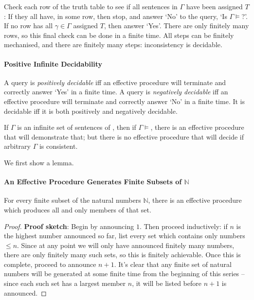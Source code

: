 Check each row of the truth table to see if all sentences in $\Gamma$ have been assigned $T$: If they all have, in some row, then stop, and answer `No' to the query, `Is $\Gamma\vDash$?'. If no row has all $\gamma\in\Gamma$ assigned $T$, then answer `Yes'. There are only finitely many rows, so this final check can be done in a finite time. All steps can be finitely mechanised, and there are finitely many steps: inconsistency is decidable.

\paragraph{Positive Infinite Decidability}

A query is \emph{positively decidable} iff an effective procedure will terminate and correctly answer `Yes' in a finite time. A query is \emph{negatively decidable} iff an effective procedure will terminate and correctly answer `No' in a finite time. It is decidable iff it is both positively and negatively decidable.

\begin{theorem}
If $\Gamma$ is an infinite set of sentences of \lone, then if $\Gamma\vDash$, there is an effective procedure that will demonstrate that; but there is no effective procedure that will
decide if arbitrary $\Gamma$ is consistent.\end{theorem}

We first show a lemma.
\paragraph{An Effective Procedure Generates Finite Subsets of $\mathbb{N}$}

\begin{lemma}
	For every finite subset of the natural numbers $\mathbb{N}$, there is an effective procedure which produces all and only members of that set. \begin{proof}
		{ \textbf{Proof sketch}: Begin by
		announcing $1$. Then proceed inductively: if $n$ is the highest
		number announced so far, list every set which contains only
		numbers $\leqslant n$.
		Since at any point we will only have announced finitely many
		numbers, there are only finitely many such sets, so this is
		finitely achievable. Once this is complete, proceed to announce
		$n+1$. It's clear that any
		finite set of natural numbers will be generated at some finite
		time from the beginning of this series – since each such set has a 
		largest member $n$, it will be listed before $n+1$ is announced.}
	\end{proof}
\end{lemma}


